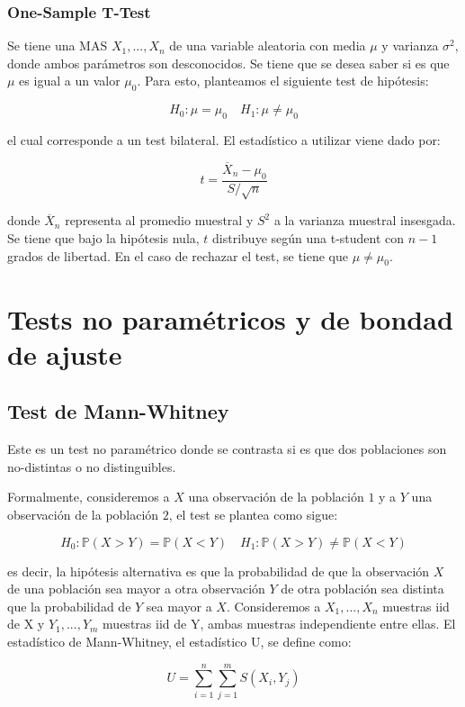 \subsubsection{One-Sample T-Test}

Se tiene una MAS $X_1,...,X_n$ de una variable aleatoria con media $\mu$ y varianza $\sigma^2$, donde ambos parámetros son desconocidos. Se tiene que se desea saber si es que $\mu$ es igual a un valor $\mu_0$. Para esto, planteamos el siguiente test de hipótesis:

$$
H_0:\mu= \mu_0 \quad H_1:\mu\neq \mu_0
$$

el cual corresponde a un test bilateral. El estadístico a utilizar viene dado por:

\[t=\dfrac{\overline{X}_n-\mu_0}{S/\sqrt{n}}\]

donde $\overline{X}_n$ representa al promedio muestral y $S^2$ a la varianza muestral insesgada. Se tiene que bajo la hipótesis nula, $t$ distribuye según una t-student con $n-1$ grados de libertad. En el caso de rechazar el test, se tiene que $\mu\neq \mu_0$. 



\section{Tests no paramétricos y de bondad de ajuste}

\subsection{Test de Mann-Whitney}

Este es un test no paramétrico donde se contrasta si es que dos poblaciones son no-distintas o no distinguibles.

Formalmente, consideremos a $X$ una observación de la población $1$ y a $Y$ una observación de la población $2$, el test se plantea como sigue:

$$
H_0:\mathbb{P}(X>Y)=\mathbb{P}(X<Y) \quad H_1:\mathbb{P}(X>Y)\neq\mathbb{P}(X<Y)
$$

es decir, la hipótesis alternativa es que la probabilidad de que la observación $X$ de una población sea mayor a otra observación $Y$ de otra población sea distinta que la probabilidad de $Y$ sea mayor a $X$. Consideremos a $X_1,...,X_n$ muestras iid de X y $Y_1,...,Y_m$ muestras iid de Y, ambas muestras independiente entre ellas. El estadístico de Mann-Whitney, el estadístico U, se define como:

$$
U=\sum\limits_{i=1}^n\sum\limits_{j=1}^mS(X_i, Y_j)
$$

